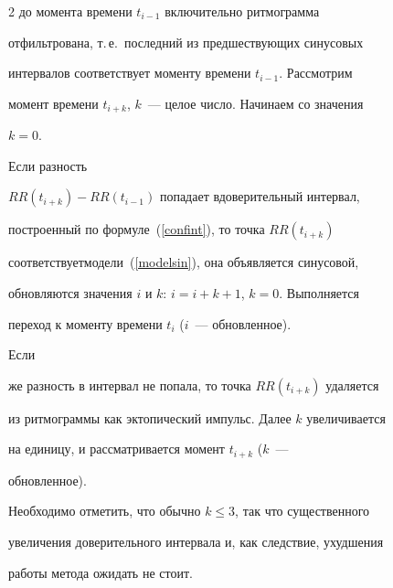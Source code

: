 \begin{multicols}{2}
до момента времени $t_{i-1}$ включительно ритмограмма


отфильтрована, т.\,е.\ последний из предшествующих синусовых


интервалов соответствует моменту времени $t_{i-1}$. Рассмотрим


момент времени $t_{i+k}$, $k$~--- целое число. Начинаем со значения


$k=0$.


\begin{description}


\item Если разность


$RR(t_{i+k})-RR(t_{i-1})$ попадает в\linebreak доверительный интервал,


построенный по формуле~(\ref{confint}), то точка $RR(t_{i+k})$


соответствует\linebreak модели~(\ref{modelsin}), она объявляется синусовой,


об\-нов\-ля\-ют\-ся значения $i$ и $k$: $i=i+k+1$, $k=0$. Выполняется


переход к моменту времени $t_i$ ($i$~--- обновленное).


\item Если


же разность в интервал не попала, то точка $RR(t_{i+k})$ удаляется


из ритмограммы как эктопический импульс. Далее $k$ увеличивается


на единицу, и рассматривается момент $t_{i+k}$ ($k$~---


обновленное).


\end{description}





Необходимо  отметить, что обычно $k\leq 3$, так что существенного


увеличения доверительного интервала и, как следствие, ухудшения


работы метода ожидать не стоит.





\begin{figure} %




\vspace*{1pt}



\end{figure}
\end{multicols}
